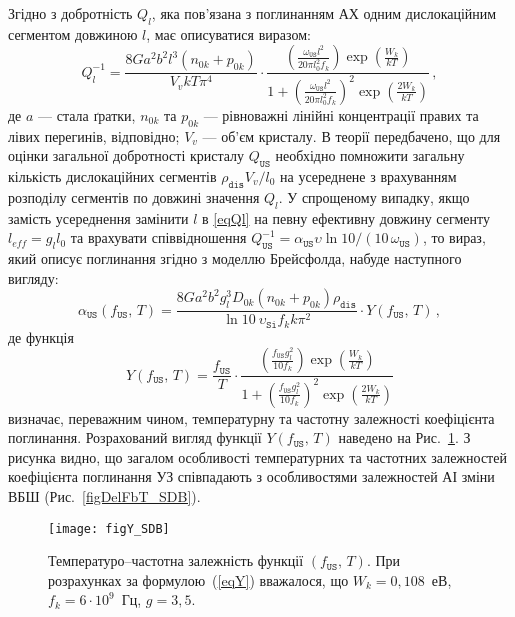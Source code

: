 \documentclass[a4paper,14pt,oneside,openany]{memoir}
\begin{document}
Згідно з \cite{Brailsford} добротність $Q_l$, яка пов'язана з поглинанням АХ одним дислокаційним сегментом довжиною $l$, має описуватися виразом:
\begin{equation}
\label{eqQl}
Q_l^{-1}=\frac{8Ga^2b^2l^3(n_{0k}+p_{0k})}{V_vkT\pi^4}\cdot
\frac{\left(\frac{\omega_\mathtt{US} l^2}{20\pi l_0^2f_k}\right)\exp{\left(\frac{W_k}{kT}\right)}}
{1+\left(\frac{\omega_\mathtt{US} l^2}{20\pi l_0^2f_k}\right)^2\exp{\left(\frac{2W_k}{kT}\right)}}\,,
\end{equation}
де $a$ --- стала ґратки,
$n_{0k}$ та $p_{0k}$ --- рівноважні лінійні концентрації правих та лівих перегинів, відповідно;
$V_v$ --- об'єм кристалу.
В теорії передбачено, що для оцінки загальної добротності кристалу $Q_\mathtt{US}$ необхідно
помножити загальну кількість дислокаційних сегментів $\rho_\mathtt{dis}V_v/l_0$
на усереднене з врахуванням розподілу сегментів по довжині значення $Q_l$.
У спрощеному випадку, якщо замість усереднення замінити $l$ в \ref{eqQl}
на певну ефективну довжину сегменту \mbox{$l_{eff} = g_l l_0$} та врахувати співвідношення $Q_\mathtt{US}^{-1} = \alpha_\mathtt{US}\upsilon\ln{10}/(10 \,\omega_\mathtt{US})$, то вираз, який описує поглинання згідно з моделлю Брейсфолда, набуде наступного вигляду:
\begin{equation}
\label{eqAlpaBr}
\alpha_\mathtt{US}(f_\mathtt{US},\,T)=\frac{8Ga^2b^2g_l^3D_{0k}(n_{0k}+p_{0k})\rho_\mathtt{dis}}{\ln{10}\:\upsilon_\mathtt{Si} f_k k\pi^2}\cdot Y(f_\mathtt{US},\,T)\,,
\end{equation}
де функція
\begin{equation}
\label{eqY}
Y(f_\mathtt{US},\,T)=\frac{f_\mathtt{US}}{T}\cdot\frac{\left(\frac{f_\mathtt{US} g_l^2}{10 f_k}\right)\exp{\left(\frac{W_k}{kT}\right)}}
{1+\left(\frac{f_\mathtt{US} g_l^2}{10 f_k}\right)^2\exp{\left(\frac{2W_k}{kT}\right)}}
\end{equation}
визначає, переважним чином, температурну та частотну залежності коефіцієнта поглинання.
Розрахований вигляд функції $Y(f_\mathtt{US},\,T)$ наведено на Рис.~\ref{figY_SDB}.
З рисунка видно, що загалом особливості температурних та частотних залежностей коефіцієнта поглинання УЗ співпадають
з особливостями залежностей АІ зміни ВБШ (Рис.~\ref{figDelFbT_SDB}).


\begin{figure}
\center
\texttt{[image: figY\_SDB]}
\caption{\label{figY_SDB}
Температуро--частотна залежність функції $(f_\mathtt{US},\,T)$.
При розрахунках за формулою~(\ref{eqY}) вважалося, що
$W_k=0,108$~еВ, $f_k=6\cdot10^9$~Гц, $g=3,5$.
}%
\end{figure}
\end{document}
